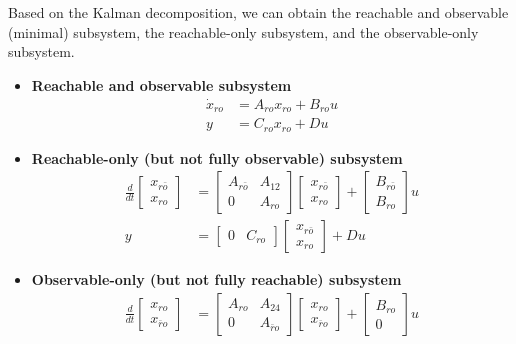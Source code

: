 \documentclass[twoside, 11pt, a4paper]{article}
\begin{document}
Based on the Kalman decomposition, we can obtain the reachable and observable (minimal) subsystem, the reachable-only subsystem, and the observable-only subsystem.
\begin{itemize}
    \item \textbf{Reachable and observable subsystem}
    \begin{align*}
        \dot{x}_{ro} &= A_{ro} x_{ro} + B_{ro} u
        \\
        y &= C_{ro} x_{ro} + D u
    \end{align*}
    \item \textbf{Reachable-only (but not fully observable) subsystem}
    \begin{align*}
        \frac{d}{dt}\begin{bmatrix} x_{r\bar{o}} \\ x_{ro}\end{bmatrix} &= 
        \left[ \begin{array}{c|c} A_{r\bar{o}} & A_{12} \\ \hline 
    0 & A_{ro}  \end{array} \right]
    \begin{bmatrix} x_{r\bar{o}} \\ x_{ro}\end{bmatrix} + \left[ \begin{array}{c} B_{r\bar{o}} \\ B_{ro} \end{array} \right] u
        \\
        y &= \left[ \begin{array}{c|c} 0 & C_{ro} \end{array} \right] \begin{bmatrix} x_{r\bar{o}} \\ x_{ro}\end{bmatrix}  + D u
    \end{align*}
    \item \textbf{Observable-only (but not fully reachable) subsystem}
    \begin{align*}
        \frac{d}{dt}\begin{bmatrix} x_{ro} \\ x_{\bar{r}o}\end{bmatrix} &= 
        \left[ \begin{array}{c|c} A_{ro} & A_{24} \\ \hline 
    0 & A_{\bar{r}o}  \end{array} \right]
    \begin{bmatrix} x_{ro} \\ x_{\bar{r}o}\end{bmatrix} + \left[ \begin{array}{c} B_{ro} \\ 0 \end{array} \right] u

\end{align*}
\end{itemize}
\end{document}
